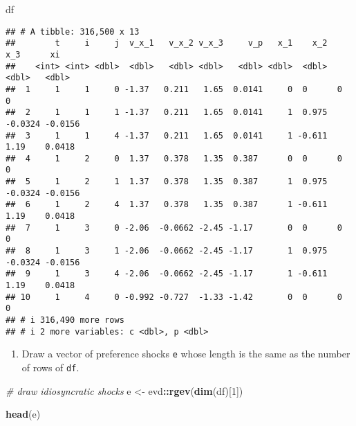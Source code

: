 \documentclass[
]{book}
\newenvironment{Shaded}{\begin{snugshade}}{\end{snugshade}}
\newcommand{\CommentTok}[1]{\textcolor[rgb]{0.56,0.35,0.01}{\textit{#1}}}
\newcommand{\DecValTok}[1]{\textcolor[rgb]{0.00,0.00,0.81}{#1}}
\newcommand{\FunctionTok}[1]{\textcolor[rgb]{0.13,0.29,0.53}{\textbf{#1}}}
\newcommand{\NormalTok}[1]{#1}
\newcommand{\OtherTok}[1]{\textcolor[rgb]{0.56,0.35,0.01}{#1}}
\newcommand{\SpecialCharTok}[1]{\textcolor[rgb]{0.81,0.36,0.00}{\textbf{#1}}}
\providecommand{\tightlist}{%
  \setlength{\itemsep}{0pt}\setlength{\parskip}{0pt}}
\begin{document}
\begin{Shaded}
\begin{Highlighting}[]
\NormalTok{df}
\end{Highlighting}
\end{Shaded}

\begin{verbatim}
## # A tibble: 316,500 x 13
##        t     i     j  v_x_1   v_x_2 v_x_3     v_p   x_1    x_2     x_3      xi
##    <int> <int> <dbl>  <dbl>   <dbl> <dbl>   <dbl> <dbl>  <dbl>   <dbl>   <dbl>
##  1     1     1     0 -1.37   0.211   1.65  0.0141     0  0      0       0     
##  2     1     1     1 -1.37   0.211   1.65  0.0141     1  0.975 -0.0324 -0.0156
##  3     1     1     4 -1.37   0.211   1.65  0.0141     1 -0.611  1.19    0.0418
##  4     1     2     0  1.37   0.378   1.35  0.387      0  0      0       0     
##  5     1     2     1  1.37   0.378   1.35  0.387      1  0.975 -0.0324 -0.0156
##  6     1     2     4  1.37   0.378   1.35  0.387      1 -0.611  1.19    0.0418
##  7     1     3     0 -2.06  -0.0662 -2.45 -1.17       0  0      0       0     
##  8     1     3     1 -2.06  -0.0662 -2.45 -1.17       1  0.975 -0.0324 -0.0156
##  9     1     3     4 -2.06  -0.0662 -2.45 -1.17       1 -0.611  1.19    0.0418
## 10     1     4     0 -0.992 -0.727  -1.33 -1.42       0  0      0       0     
## # i 316,490 more rows
## # i 2 more variables: c <dbl>, p <dbl>
\end{verbatim}

\begin{enumerate}
\def\labelenumi{\arabic{enumi}.}
\setcounter{enumi}{5}
\tightlist
\item
  Draw a vector of preference shocks \texttt{e} whose length is the same as the number of rows of \texttt{df}.
\end{enumerate}

\begin{Shaded}
\begin{Highlighting}[]
\CommentTok{\# draw idiosyncratic shocks}
\NormalTok{e }\OtherTok{\textless{}{-}}\NormalTok{ evd}\SpecialCharTok{::}\FunctionTok{rgev}\NormalTok{(}\FunctionTok{dim}\NormalTok{(df)[}\DecValTok{1}\NormalTok{])}
\end{Highlighting}
\end{Shaded}

\begin{Shaded}
\begin{Highlighting}[]
\FunctionTok{head}\NormalTok{(e)}
\end{Highlighting}
\end{Shaded}
\end{document}
